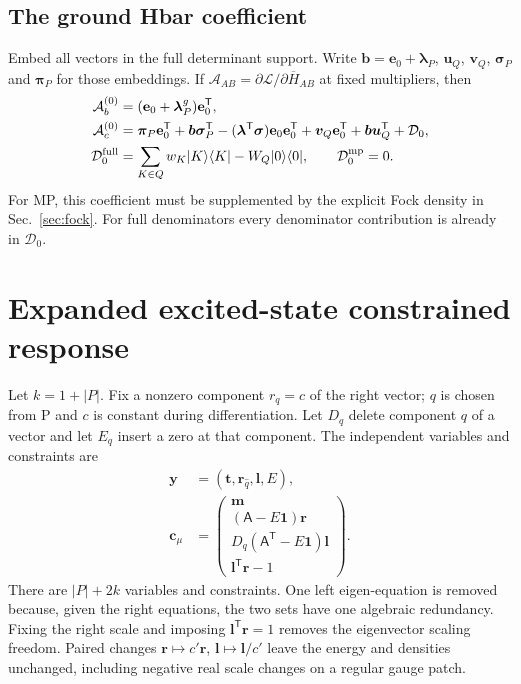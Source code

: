 \documentclass[11pt,letterpaper]{article}
\numberwithin{equation}{section}
\newcommand{\ket}[1]{\lvert #1\rangle}
\newcommand{\bra}[1]{\langle #1\rvert}
\newcommand{\bH}{\overline H}
\newcommand{\T}{\mathsf T}
\newcommand{\evec}{\mathbf e_0}
\begin{document}
\subsection{The ground Hbar coefficient}
Embed all vectors in the full determinant support. Write
$\bm b=\evec+\bm\lambda_P$, $\bm u_Q$, $\bm v_Q$, $\bm\sigma_P$ and
$\bm\pi_P$ for those embeddings. If
$\mathcal A_{AB}=\partial\mathcal L/\partial\bH_{AB}$ at fixed multipliers,
then
\begin{align}
 \mathcal A_b^{(0)}&=(\evec+\bm\lambda_P^g)\evec^{\T},\\
 \mathcal A_c^{(0)}&=\bm\pi_P\evec^{\T}
   +\bm b\bm\sigma_P^{\T}
   -(\bm\lambda^{\T}\bm\sigma)\evec\evec^{\T}
   +\bm v_Q\evec^{\T}+\bm b\bm u_Q^{\T}+\mathcal D_0,\\
 \mathcal D_0^{\rm full}&=\sum_{K\in Q}w_K\ket{K}\bra{K}
                                     -W_Q\ket{0}\bra{0},\qquad
 \mathcal D_0^{\rm mp}=0.
 \label{eq:groundcoeff}
\end{align}
For MP, this coefficient must be supplemented by the explicit Fock density
in Sec.~\ref{sec:fock}. For full denominators every denominator contribution
is already in $\mathcal D_0$.

\section{Expanded excited-state constrained response}
\label{sec:excited}
Let $k=1+|P|$. Fix a nonzero component $r_q=c$ of the right vector; $q$ is
chosen from P and $c$ is constant during differentiation. Let $D_q$ delete
component $q$ of a vector and let $E_q$ insert a zero at that component.
The independent variables and constraints are
\begin{align}
 \bm y&=(\bm t,\bm r_{\widehat q},\bm l,E),\\
 \bm c_\mu&=\begin{pmatrix}
  \bm m\\(\mathsf A-E\mathbf1)\bm r\\
  D_q(\mathsf A^{\T}-E\mathbf1)\bm l\\\bm l^{\T}\bm r-1
 \end{pmatrix}.
 \label{eq:excconstraints}
\end{align}
There are $|P|+2k$ variables and constraints. One left eigen-equation is
removed because, given the right equations, the two sets have one algebraic
redundancy. Fixing the right scale and imposing $\bm l^{\T}\bm r=1$
removes the eigenvector scaling freedom. Paired changes
$\bm r\mapsto c'\bm r$, $\bm l\mapsto\bm l/c'$ leave the energy and densities
unchanged, including negative real scale changes on a regular gauge patch.
\end{document}
